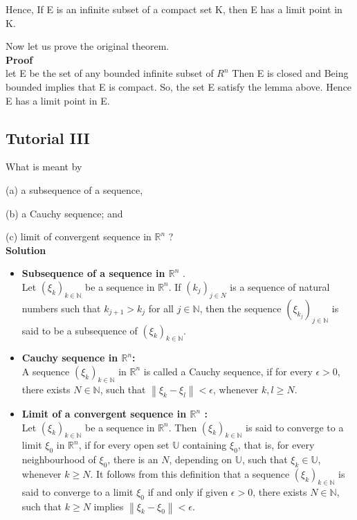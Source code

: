 \documentclass{article}
\begin{document}
Hence, If E is an infinite subset of a compact set K, then E has a limit point in K.


Now let us prove the original theorem.\\

\textbf{Proof }\\
let E be the set of any bounded infinite subset of $R^n$
Then E is closed and Being bounded implies that E is compact.
So, the set E satisfy the lemma above. Hence E has a limit point in E.


\subsection{Tutorial III}

 What is meant by
 
(a) a subsequence of a sequence, 

(b) a Cauchy sequence; and 

(c) limit of convergent sequence in $\mathbb{R}^{n}$ ?\\

\textbf{Solution}

\begin{itemize}
    \item  \textbf{Subsequence of a sequence in $\mathbb{R}^{n}$ }.\\ Let $\left(\xi_{k}\right)_{k \in \mathbb{N}}$ be a sequence in $\mathbb{R}^{n}$. If $\left(k_{j}\right)_{j \in N}$ is a sequence of natural numbers such that $k_{j+1}>k_{j}$ for all $j \in \mathbb{N}$, then the sequence $\left(\xi_{k_{j}}\right)_{j \in \mathbb{N}}$ is said to be a subsequence of $\left(\xi_{k}\right)_{k \in \mathbb{N}}$.
    \item \textbf{Cauchy sequence in $\mathbb{R}^{n}$:}\\
    A sequence $\left(\xi_{k}\right)_{k \in \mathbb{N}}$ in $\mathbb{R}^{n}$ is called a Cauchy sequence, if for every $\epsilon>0$, there exists $N \in \mathbb{N}$, such that $\left\|\xi_{k}-\xi_{l}\right\|<\epsilon$, whenever $k, l \geq N$.
    \item \textbf{Limit of a convergent sequence in $\mathbb{R}^{n}$ :} \\
    Let $\left(\xi_{k}\right)_{k \in \mathbb{N}}$ be a sequence in $\mathbb{R}^{n}$. Then $\left(\xi_{k}\right)_{k \in \mathbb{N}}$ is said to converge to a limit $\xi_{0}$ in $\mathbb{R}^{n}$, if for every open set $\mathbb{U}$ containing $\xi_{0}$, that is, for every neighbourhood of $\xi_{0}$, there is an $N$, depending on $\mathbb{U}$, such that $\xi_{k} \in \mathbb{U}$, whenever $k \geq N$. It follows from this definition that a sequence $\left(\xi_{k}\right)_{k \in \mathbb{N}}$ is said to converge to a limit $\xi_{0}$ if and only if given $\epsilon>0$, there exists $N \in \mathbb{N}$, such that $k \geq N$ implies $\left\|\xi_{k}-\xi_{0}\right\|<\epsilon$.


\end{itemize}
\end{document}
